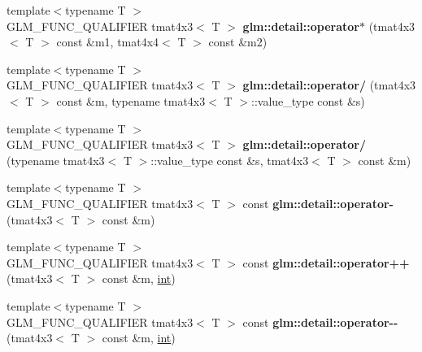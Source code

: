 \begin{DoxyCompactItemize}
\item 
\hypertarget{namespaceglm_1_1detail_a897de0e32ee803afc8a311acc5571ca2}{}{\footnotesize template$<$typename T $>$ }\\G\+L\+M\+\_\+\+F\+U\+N\+C\+\_\+\+Q\+U\+A\+L\+I\+F\+I\+E\+R tmat4x3$<$ T $>$ {\bfseries glm\+::detail\+::operator$\ast$} (tmat4x3$<$ T $>$ const \&m1, tmat4x4$<$ T $>$ const \&m2)\label{namespaceglm_1_1detail_a897de0e32ee803afc8a311acc5571ca2}

\item 
\hypertarget{namespaceglm_1_1detail_a2785f9fcdd529ebe0e64c659af185666}{}{\footnotesize template$<$typename T $>$ }\\G\+L\+M\+\_\+\+F\+U\+N\+C\+\_\+\+Q\+U\+A\+L\+I\+F\+I\+E\+R tmat4x3$<$ T $>$ {\bfseries glm\+::detail\+::operator/} (tmat4x3$<$ T $>$ const \&m, typename tmat4x3$<$ T $>$\+::value\+\_\+type const \&s)\label{namespaceglm_1_1detail_a2785f9fcdd529ebe0e64c659af185666}

\item 
\hypertarget{namespaceglm_1_1detail_a1d12379a663391989f9459dc27c2fa25}{}{\footnotesize template$<$typename T $>$ }\\G\+L\+M\+\_\+\+F\+U\+N\+C\+\_\+\+Q\+U\+A\+L\+I\+F\+I\+E\+R tmat4x3$<$ T $>$ {\bfseries glm\+::detail\+::operator/} (typename tmat4x3$<$ T $>$\+::value\+\_\+type const \&s, tmat4x3$<$ T $>$ const \&m)\label{namespaceglm_1_1detail_a1d12379a663391989f9459dc27c2fa25}

\item 
\hypertarget{namespaceglm_1_1detail_afd8ceb48f695c871885be7d7d39c2199}{}{\footnotesize template$<$typename T $>$ }\\G\+L\+M\+\_\+\+F\+U\+N\+C\+\_\+\+Q\+U\+A\+L\+I\+F\+I\+E\+R tmat4x3$<$ T $>$ const {\bfseries glm\+::detail\+::operator-\/} (tmat4x3$<$ T $>$ const \&m)\label{namespaceglm_1_1detail_afd8ceb48f695c871885be7d7d39c2199}

\item 
\hypertarget{namespaceglm_1_1detail_a6d8f2ccdc37c13b0d1d5a6f1b68de449}{}{\footnotesize template$<$typename T $>$ }\\G\+L\+M\+\_\+\+F\+U\+N\+C\+\_\+\+Q\+U\+A\+L\+I\+F\+I\+E\+R tmat4x3$<$ T $>$ const {\bfseries glm\+::detail\+::operator++} (tmat4x3$<$ T $>$ const \&m, \hyperlink{_s_d_l__thread_8h_a6a64f9be4433e4de6e2f2f548cf3c08e}{int})\label{namespaceglm_1_1detail_a6d8f2ccdc37c13b0d1d5a6f1b68de449}

\item 
\hypertarget{namespaceglm_1_1detail_a172c90716fd876b8e2e88fde8ab9b510}{}{\footnotesize template$<$typename T $>$ }\\G\+L\+M\+\_\+\+F\+U\+N\+C\+\_\+\+Q\+U\+A\+L\+I\+F\+I\+E\+R tmat4x3$<$ T $>$ const {\bfseries glm\+::detail\+::operator-\/-\/} (tmat4x3$<$ T $>$ const \&m, \hyperlink{_s_d_l__thread_8h_a6a64f9be4433e4de6e2f2f548cf3c08e}{int})\label{namespaceglm_1_1detail_a172c90716fd876b8e2e88fde8ab9b510}


\end{DoxyCompactItemize}
